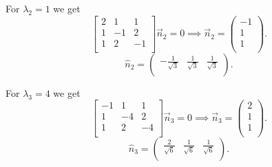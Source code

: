 \begin{derivation}
\begin{enumerate}[label=(\alph*)]
      For $\lambda_2 = 1$ we get
      \begin{equation*}
        \begin{bmatrix}
          2 & 1 & 1\\
        1 & -1 & 2\\
        1 & 2 & -1\\
        \end{bmatrix} \Vec{n}_2 = 0 \implies \Vec{n}_2 = \begin{pmatrix}
          -1\\
        1\\
        1\\
        \end{pmatrix}
      .\end{equation*}
      \begin{equation*}
        \hat{n}_2 = \begin{pmatrix}
          - \frac{1}{\sqrt{3}} & \frac{1}{\sqrt{3}} & \frac{1}{\sqrt{3}}\\
        \end{pmatrix}
      .\end{equation*}
      

      For $\lambda_3 = 4$ we get
      \begin{equation*}
        \begin{bmatrix}
          -1 & 1 & 1\\
        1 & -4 & 2\\
        1 & 2 & -4\\
        \end{bmatrix} \Vec{n}_3 = 0 \implies \Vec{n}_3 = \begin{pmatrix}
          2\\
        1\\
        1\\
        \end{pmatrix}
      .\end{equation*}
      \begin{equation*}
        \hat{n}_3 = \begin{pmatrix}
          \frac{2}{\sqrt{6}} & \frac{1}{\sqrt{6}} & \frac{1}{\sqrt{6}}\\
        \end{pmatrix}
      .\end{equation*}
      
  \end{enumerate}
\end{derivation}

